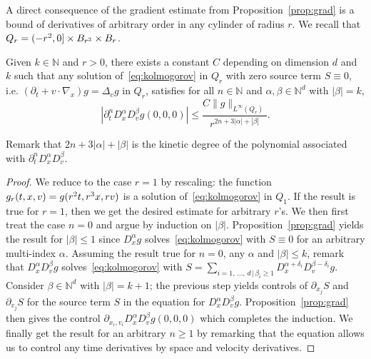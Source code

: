 \documentclass[AHL,Unicode,longabstracts,published]{cedram}
\newcommand{\N}{\mathbb{N}}
\begin{document}
A direct consequence of the gradient estimate from Proposition~\ref{prop:grad} is a bound of derivatives of arbitrary order in any cylinder of radius $r$. We recall that $Q_r\linebreak= (-r^2,0] \times B_{r^3} \times B_r$.

\begin{coro}\label{cor:deriv}
Given $k \in \N$ and $r>0$, there exists a constant $C$ depending on dimension $d$ and $k$ such that any solution of~\eqref{eq:kolmogorov} in $Q_r$ with zero source term $S \equiv 0$, i.e. $(\partial_t + v \cdot \nabla_x) g = \Delta_v g$ in $Q_r$, satisfies for all $n \in \N$ and $\alpha,\beta \in \N^d$ with $|\beta|=k$,
\[
\left|\partial_t^n D^\alpha_x D^\beta_v g(0,0,0)\right| \le \frac{C
\|g\|_{L^\infty(Q_r)}}{r^{2n +3|\alpha|+|\beta|}}.
\]
\end{coro}


\begin{rema}
Remark that $2n+3|\alpha|+|\beta|$ is the kinetic degree of the polynomial associated with $\partial_t^n D^\alpha_x D^\beta_v$.
\end{rema}


\begin{proof}
We reduce to the case $r=1$ by rescaling: the function $g_r (t,x,v) \linebreak= g(r^2 t, r^3 x, r v)$ is a solution of~\eqref{eq:kolmogorov} in $Q_1$. If the result is true for $r=1$, then we get the desired estimate for arbitrary $r$'s. We then first treat the case $n=0$ and argue by induction on $|\beta|$. Proposition~\ref{prop:grad} yields the result for $|\beta|\le 1$ since $D^\alpha_x g$ solves~\eqref{eq:kolmogorov} with $S \equiv 0$ for an arbitrary multi-index $\alpha$. Assuming the result true for $n=0$, any $\alpha$ and $|\beta| \le k$, remark that $D^\alpha_x D_v ^\beta g$ solves~\eqref{eq:kolmogorov} with $S =\sum_{i=1,\,\dots,\,d \, | \, \beta_i \ge 1} D^{\alpha+\delta_i} _x D^{\beta-\delta_i}_ v g$. Consider $\beta \in \N^d$ with $|\beta|=k+1$; the previous step yields controls of $\partial_{x_j} S$ and $\partial_{v_j} S$ for the source term $S$ in the equation for $D^\alpha_x D_v ^\beta g$. Proposition~\ref{prop:grad} then gives the control $\partial_{x_i,v_i} D^\alpha_x D_v ^\beta g(0,0,0)$ which completes the induction. We finally get the result for an arbitrary $n \ge 1$ by remarking that the equation allows us to control any time derivatives by space and velocity derivatives.
\end{proof}
\end{document}
